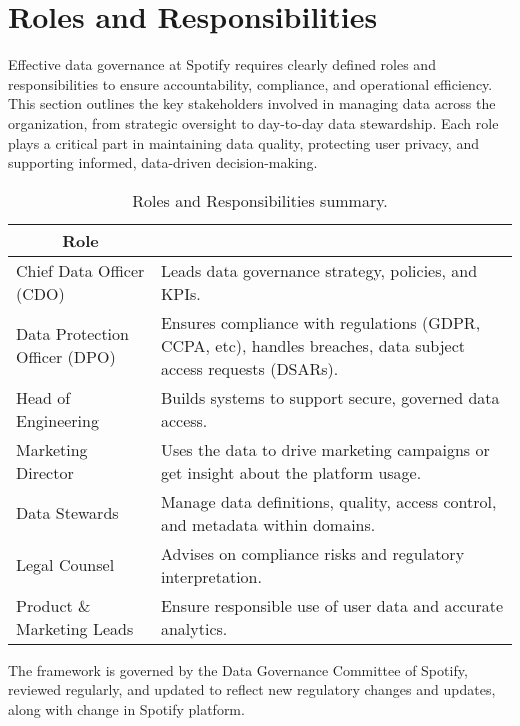 \documentclass[11pt,a4paper,computermodern]{article}
\begin{document}
\section*{Roles and Responsibilities}

Effective data governance at Spotify requires clearly defined roles and responsibilities to ensure accountability, compliance, and operational efficiency. This section outlines the key stakeholders involved in managing data across the organization, from strategic oversight to day-to-day data stewardship. Each role plays a critical part in maintaining data quality, protecting user privacy, and supporting informed, data-driven decision-making.

\begin{table}[ht]
	\centering
	\begin{threeparttable}
		\caption{Roles and Responsibilities summary.}
		\label{table:roles}
		\begin{tabularx}{0.99\textwidth}{l >{\arraybackslash}X}
			\toprule
			\multicolumn{1}{c}{\textbf{Role}} & \multicolumn{1}{c}{\textbf{Key Responsibilities}} \\
			\midrule
			Chief Data Officer (CDO) & Leads data governance strategy, policies, and KPIs. \\
			Data Protection Officer (DPO) & Ensures compliance with regulations (GDPR, CCPA, etc), handles breaches, data subject access requests (DSARs). \\
			Head of Engineering & Builds systems to support secure, governed data access. \\
			Marketing Director & Uses the data to drive marketing campaigns or get insight about the platform usage. \\
			Data Stewards & Manage data definitions, quality, access control, and metadata within domains. \\
			Legal Counsel & Advises on compliance risks and regulatory interpretation. \\
			Product \& Marketing Leads & Ensure responsible use of user data and accurate analytics. \\
			\bottomrule
		\end{tabularx}
	\end{threeparttable}
\end{table}

The framework is governed by the Data Governance Committee of Spotify, reviewed regularly, and updated to reflect new regulatory changes and updates, along with change in Spotify platform.
\end{document}
